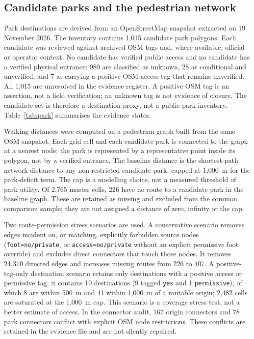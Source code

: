 \documentclass[times,twoside]{_Templates/MultiTargetManuscript}
\begin{document}
\subsection{Candidate parks and the pedestrian network}

Park destinations are derived from an OpenStreetMap snapshot extracted on
19 November 2026. The inventory contains 1,015 candidate park polygons. Each
candidate was reviewed against archived OSM tags and, where available, official
or operator context. No candidate has verified public access and no candidate has
a verified physical entrance: 980 are classified as unknown, 28 as conditional
and unverified, and 7 as carrying a positive OSM access tag that remains
unverified. All 1,015 are unresolved in the evidence register. A positive OSM
tag is an assertion, not a field verification; an unknown tag is not evidence of
closure. The candidate set is therefore a destination proxy, not a public-park
inventory. Table~\ref{tab:park} summarises the evidence states.

Walking distances were computed on a pedestrian graph built from the same OSM
snapshot. Each grid cell and each candidate park is connected to the graph at a
nearest node; the park is represented by a representative point inside its
polygon, not by a verified entrance. The baseline distance is the shortest-path
network distance to any non-restricted candidate park, capped at 1,000~m for the
park-deficit term. The cap is a modelling choice, not a measured threshold of
park utility. Of 2,765 master cells, 226 have no route to a candidate park in
the baseline graph. These are retained as missing and excluded from the common
comparison sample; they are not assigned a distance of zero, infinity or the cap.

Two route-permission stress scenarios are used. A conservative scenario removes
edges incident on, or matching, explicitly forbidden source nodes
(\texttt{foot=no/private}, or \texttt{access=no/private} without an explicit
permissive foot override) and excludes direct connectors that touch those nodes.
It removes 24,370 directed edges and increases missing routes from 226 to 407.
A positive-tag-only destination scenario retains only destinations with a
positive access or permissive tag; it contains 10 destinations (9 tagged
\texttt{yes} and 1 \texttt{permissive}), of which 8 are within 500~m and 41
within 1,000~m of a routable origin; 2,482 cells are saturated at the 1,000~m
cap. This scenario is a coverage stress test, not a better estimate of access.
In the connector audit, 167 origin connectors and 78 park connectors conflict
with explicit OSM node restrictions. These conflicts are retained in the
evidence file and are not silently repaired.
\end{document}

